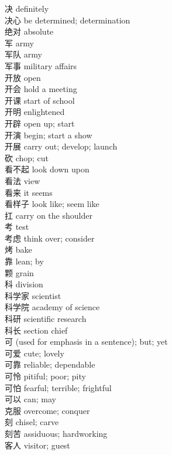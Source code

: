 决 \quad definitely\\
决心 \quad be determined; determination\\
绝对 \quad absolute\\
军 \quad army\\
军队 \quad army\\
军事 \quad military affairs\\
开放 \quad open\\
开会 \quad hold a meeting\\
开课 \quad start of school\\
开明 \quad enlightened\\
开辟 \quad open up; start\\
开演 \quad begin; start a show\\
开展 \quad carry out; develop; launch\\
砍 \quad chop; cut\\
看不起 \quad look down upon\\
看法 \quad view\\
看来 \quad it seems\\
看样子 \quad look like; seem like\\
扛 \quad carry on the shoulder\\
考 \quad test\\
考虑 \quad think over; consider\\
烤 \quad bake\\
靠 \quad lean; by\\
颗 \quad grain\\
科 \quad division\\
科学家 \quad scientist\\
科学院 \quad academy of science\\
科研 \quad scientific research\\
科长 \quad section chief\\
可 \quad (used for emphasis in a sentence); but; yet\\
可爱 \quad cute; lovely\\
可靠 \quad reliable; dependable\\
可怜 \quad pitiful; poor; pity\\
可怕 \quad fearful; terrible; frightful\\
可以 \quad can; may\\
克服 \quad overcome; conquer\\
刻 \quad chisel; carve\\
刻苦 \quad assiduous; hardworking\\
客人 \quad visitor; guest\\
